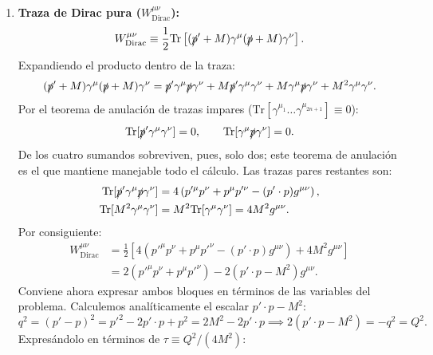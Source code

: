 \documentclass[10pt,a4paper]{article}
\begin{document}
\begin{enumerate}
    \item \textbf{Traza de Dirac pura ($W_{\text{Dirac}}^{\mu\nu}$):}
    \begin{equation}
    W_{\text{Dirac}}^{\mu\nu} \equiv \frac{1}{2} \text{Tr} \left[ (\slashed{p}' + M) \gamma^\mu (\slashed{p} + M) \gamma^\nu \right].
    \end{equation}
    Expandiendo el producto dentro de la traza:
    \begin{equation}
    (\slashed{p}' + M) \gamma^\mu (\slashed{p} + M) \gamma^\nu = \slashed{p}' \gamma^\mu \slashed{p} \gamma^\nu + M \slashed{p}' \gamma^\mu \gamma^\nu + M \gamma^\mu \slashed{p} \gamma^\nu + M^2 \gamma^\mu \gamma^\nu.
    \end{equation}
    Por el teorema de anulación de trazas impares ($\text{Tr}[\gamma^{\mu_1}\dots\gamma^{\mu_{2n+1}}] \equiv 0$):
    \begin{equation}
    \text{Tr}[\slashed{p}' \gamma^\mu \gamma^\nu] = 0, \qquad \text{Tr}[\gamma^\mu \slashed{p} \gamma^\nu] = 0.
    \end{equation}
    De los cuatro sumandos sobreviven, pues, solo dos; este teorema de anulación es el que mantiene manejable todo el cálculo. Las trazas pares restantes son:
    \begin{align}
    \text{Tr}[\slashed{p}' \gamma^\mu \slashed{p} \gamma^\nu] &= 4 \left( p'^\mu p^\nu + p^\mu p'^\nu - (p' \cdot p) g^{\mu\nu} \right), \\
    \text{Tr}[M^2 \gamma^\mu \gamma^\nu] &= M^2 \text{Tr}[\gamma^\mu \gamma^\nu] = 4 M^2 g^{\mu\nu}.
    \end{align}
    Por consiguiente:
    \begin{align}
    W_{\text{Dirac}}^{\mu\nu} &= \frac{1}{2} \left[ 4 (p'^\mu p^\nu + p^\mu p'^\nu - (p' \cdot p) g^{\mu\nu}) + 4 M^2 g^{\mu\nu} \right] \nonumber \\
    &= 2 \left( p'^\mu p^\nu + p^\mu p'^\nu \right) - 2 (p' \cdot p - M^2) g^{\mu\nu}.
    \end{align}
    Conviene ahora expresar ambos bloques en términos de las variables del problema. Calculemos analíticamente el escalar $p' \cdot p - M^2$:
    \begin{equation}
    q^2 = (p' - p)^2 = p'^2 - 2 p' \cdot p + p^2 = 2M^2 - 2 p' \cdot p \implies 2 (p' \cdot p - M^2) = -q^2 = Q^2.
    \end{equation}
    Expresándolo en términos de $\tau \equiv Q^2/(4M^2)$:
    \begin{equation}

\end{equation}
\end{enumerate}
\end{document}
